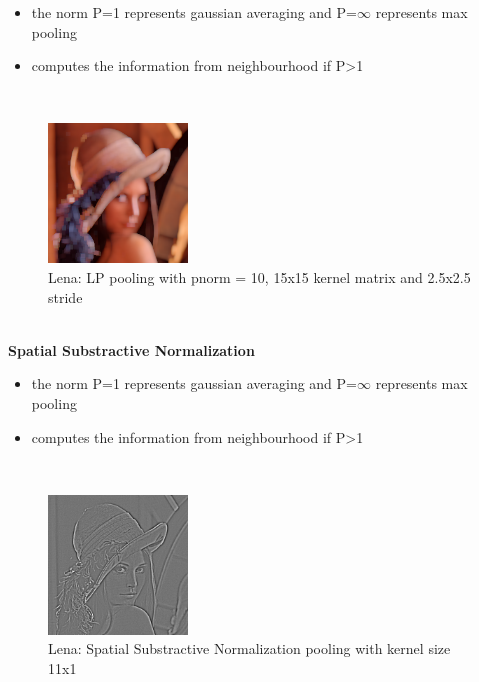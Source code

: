 \begin{itemize}
	\item{the norm P=1 represents gaussian averaging and P=$\infty$ represents max pooling}
	\item{computes the information from neighbourhood if P>1}
\end{itemize}
~\\
\begin{figure}[h]
	\begin{center}
		\includegraphics[width=140px,height=140px]{src/img/state/lena-lp}
		\caption{Lena: LP pooling with pnorm = 10, 15x15 kernel matrix and 2.5x2.5 stride} \label{fig:lena-lppooling}
    \end{center}
\end{figure}


~\\




\textbf{Spatial Substractive Normalization}

\begin{itemize}
	\item{the norm P=1 represents gaussian averaging and P=$\infty$ represents max pooling}
	\item{computes the information from neighbourhood if P>1}
\end{itemize}
~\\
\begin{figure}[h]
	\begin{center}
		\includegraphics[width=140px,height=140px]{src/img/state/lena-spatialsubstractivenormalization}
		\caption{Lena: Spatial Substractive Normalization pooling with kernel size 11x1} \label{fig:lena-lppooling}
    \end{center}
\end{figure}
\newpage

